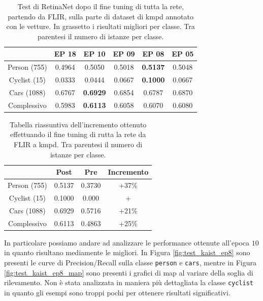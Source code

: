 \begin{table}[]
    \centering
    \begin{tabular}{c|c|c|c|c|c|}
    \cline{2-6}
     & EP 18 & EP 10 & EP 09 & EP 08 & EP 05 \\ \hline
    \multicolumn{1}{|c|}{Person (755)} & 0.4964 & 0.5050 & 0.5018 & \textbf{0.5137} & 0.5048 \\ \hline
    \multicolumn{1}{|c|}{Cyclist (15)} & 0.0333 & 0.0444 & 0.0667 & \textbf{0.1000} & 0.0667 \\ \hline
    \multicolumn{1}{|c|}{Cars (1088)} & 0.6767 & \textbf{0.6929} & 0.6854 & 0.6787 & 0.6870 \\ \hline
    \multicolumn{1}{|c|}{Complessivo} & 0.5983 & \textbf{0.6113} & 0.6058 & 0.6070 & 0.6080 \\ \hline
    \end{tabular}
    \caption{Test di RetinaNet dopo il fine tuning di tutta la rete, partendo da FLIR, sulla parte di dataset di \ac{kmpd} annotato con le vetture. In grassetto i risultati migliori per classe. Tra parentesi il numero di istanze per classe.}
    \label{tab:fine_tuning_kaist_flir}
\end{table}
\begin{table}[]
    \centering
    \begin{tabular}{c|c|c|c|}
    \cline{2-4}
     & Post & Pre & Incremento \\ \hline
    \multicolumn{1}{|c|}{Person (755)} & 0.5137 & 0.3730 & +37\% \\ \hline
    \multicolumn{1}{|c|}{Cyclist (15)} & 0.1000 & 0.000 & + \\ \hline
    \multicolumn{1}{|c|}{Cars (1088)} & 0.6929 & 0.5716 & +21\% \\ \hline
    \multicolumn{1}{|c|}{Complessivo} & 0.6113 & 0.4863 & +25\% \\ \hline
    \end{tabular}
    \caption{Tabella riassuntiva dell'incremento ottenuto effettuando il fine tuning di rutta la rete da FLIR a \ac{kmpd}. Tra parentesi il numero di istanze per classe. }
    \label{tab:fine_tuning_kaist_flir_increment}
\end{table}

In particolare possiamo andare ad analizzare le performance ottenute all'epoca $10$ in quanto risultano mediamente le migliori. In Figura \ref{fig:test_kaist_ep8} sono presenti le curve di Precision/Recall sulla classe \texttt{person} e \texttt{cars}, mentre in Figura \ref{fig:test_kaist_ep8_map} sono presenti i grafici di \ac{map} al variare della soglia di rilevamento. Non è stata analizzata in maniera più dettagliata la classe \texttt{cyclist} in quanto gli esempi sono troppi pochi per ottenere risultati significativi. 

